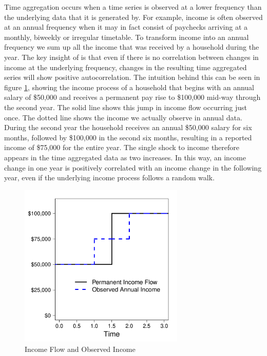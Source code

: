 \documentclass[AER]{AEA}
\begin{document}
Time aggregation occurs when a time series is observed at a lower frequency than the underlying data that it is generated by. For example, income is often observed at an annual frequency when it may in fact consist of paychecks arriving at a monthly, biweekly or irregular timetable. To transform income into an annual frequency we sum up all the income that was received by a household during the year. The key insight of \cite{working_note_1960} is that even if there is no correlation between changes in income at the underlying frequency, changes in the resulting time aggregated series will show positive autocorrelation. The intuition behind this can be seen in figure \ref{fig:TimeAggExample}, showing the income process of a household that begins with an annual salary of \$50,000 and receives a permanent pay rise to \$100,000 mid-way through the second year. The solid line shows this jump in income flow occurring just once. The dotted line shows the income we actually observe in annual data. During the second year the household receives an annual \$50,000 salary for six months, followed by \$100,000 in the second six months, resulting in a reported income of \$75,000 for the entire year. The single shock to income therefore appears in the time aggregated data as two increases. In this way, an income change in one year is positively correlated with an income change in the following year, even if the underlying income process follows a random walk.

\begin{figure}
	\includegraphics[width=0.7\textwidth]{../Code/Figures/TimeAggAER_simple.pdf}
	\caption{Income Flow and Observed Income}
	\label{fig:TimeAggExample}
\end{figure}
\end{document}
